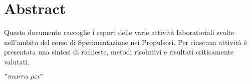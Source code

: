 \section*{Abstract}
\thispagestyle{empty}
Questo documento raccoglie i report delle varie attività laboratoriali svolte nell'ambito del corso di Sperimentazione nei Propulsori. Per ciascuna attività è presentata una sintesi di richieste, metodi risolutivi e risultati criticamente valutati.


\begin{flushright}
\huge \huge $"\pi \alpha \nu \tau \alpha \;\rho \varepsilon \iota"$
\end{flushright}

